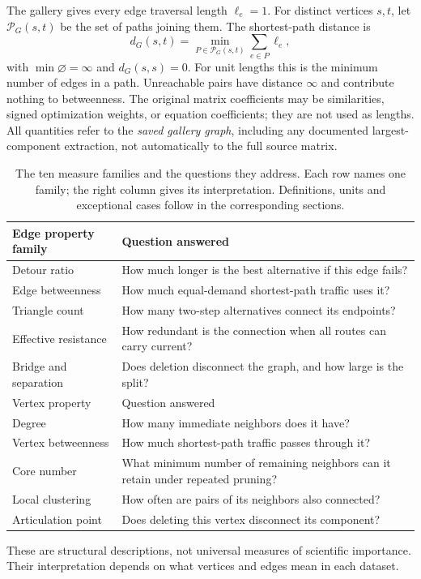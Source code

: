 \documentclass[11pt]{article}
\begin{document}
The gallery gives every edge traversal length $\ell_e=1$. For distinct vertices $s,t$, let $\mathcal P_G(s,t)$ be the set of paths joining them. The shortest-path distance is
\[
 d_G(s,t)=\min_{P\in\mathcal P_G(s,t)}\sum_{e\in P}\ell_e,
\]
with $\min\varnothing=\infty$ and $d_G(s,s)=0$. For unit lengths this is the minimum number of edges in a path. Unreachable pairs have distance $\infty$ and contribute nothing to betweenness. The original matrix coefficients may be similarities, signed optimization weights, or equation coefficients; they are not used as lengths. All quantities refer to the \emph{saved gallery graph}, including any documented largest-component extraction, not automatically to the full source matrix.

\begin{table}[htbp]\centering\small\caption{The ten measure families and the questions they address. Each row names one family; the right column gives its interpretation. Definitions, units and exceptional cases follow in the corresponding sections.}\label{tab:measures}
\begin{tabularx}{\linewidth}{lX}
\toprule Edge property family & Question answered\\\midrule
Detour ratio & How much longer is the best alternative if this edge fails?\\
Edge betweenness & How much equal-demand shortest-path traffic uses it?\\
Triangle count & How many two-step alternatives connect its endpoints?\\
Effective resistance & How redundant is the connection when all routes can carry current?\\
Bridge and separation & Does deletion disconnect the graph, and how large is the split?\\\midrule
Vertex property & Question answered\\\midrule
Degree & How many immediate neighbors does it have?\\
Vertex betweenness & How much shortest-path traffic passes through it?\\
Core number & What minimum number of remaining neighbors can it retain under repeated pruning?\\
Local clustering & How often are pairs of its neighbors also connected?\\
Articulation point & Does deleting this vertex disconnect its component?\\\bottomrule
\end{tabularx}\end{table}
These are structural descriptions, not universal measures of scientific importance. Their interpretation depends on what vertices and edges mean in each dataset.
\end{document}
